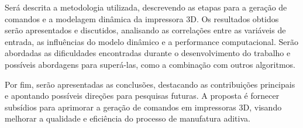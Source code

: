Será descrita a metodologia utilizada, descrevendo as
etapas para a geração de comandos e a modelagem dinâmica da impressora 3D. Os resultados obtidos serão 
apresentados e discutidos, analisando as correlações entre as variáveis de entrada, as influências do 
modelo dinâmico e a performance computacional. Serão abordadas as dificuldades encontradas durante o 
desenvolvimento do trabalho e possíveis abordagens para superá-las, como a combinação com outros algoritmos.

Por fim, serão apresentadas as conclusões, destacando as contribuições principais e apontando possíveis 
direções para pesquisas futuras. A proposta é fornecer subsídios para aprimorar a geração de comandos em 
impressoras 3D, visando melhorar a qualidade e eficiência do processo de manufatura aditiva.